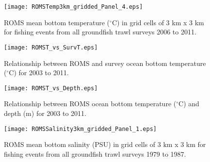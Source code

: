 \documentclass[11pt]{book}\usepackage[]{graphicx}\usepackage[]{color}
\begin{document}
\newpage

\begin{figure}[!htp]
\ContinuedFloat
\begin{center}
\texttt{[image: ROMSTemp3km\_gridded\_Panel\_4.eps]}
\end{center}

\caption{ROMS mean bottom temperature ($^\circ$C) in grid cells of 3 km x 3 km for fishing events from all groundfish trawl surveys 2006 to 2011.}
\label{fig:ROMStemp06to11}
\end{figure}

\newpage


\graphicspath{{c:/GitHub/SPERA-Maps/Results/Figures/}}
\begin{figure}[!htp]
\begin{center}
\texttt{[image: ROMST\_vs\_SurvT.eps]}
\end{center}
\caption{Relationship between ROMS and survey ocean bottom temperature ($^\circ$C) for 2003 to 2011.}
\label{fig:ROMSsurvT}
\end{figure}

\newpage 


\graphicspath{{c:/GitHub/SPERA-Maps/Results/Figures/}}
\begin{figure}[!htp]
\begin{center}
\texttt{[image: ROMST\_vs\_Depth.eps]}
\end{center}
\caption{Relationship between ROMS ocean bottom temperature ($^\circ$C) and depth (m) for 2003 to 2011.}
\label{fig:ROMST.depth}
\end{figure}

\newpage 

\begin{figure}[!htp]
\begin{center}
\texttt{[image: ROMSSalinity3km\_gridded\_Panel\_1.eps]}
\end{center}

\caption{ROMS mean bottom salinity (PSU) in grid cells of 3 km x 3 km for fishing events from all groundfish trawl surveys 1979 to 1987.}
\label{fig:ROMSsal79to87}
\end{figure}

\newpage
\end{document}
